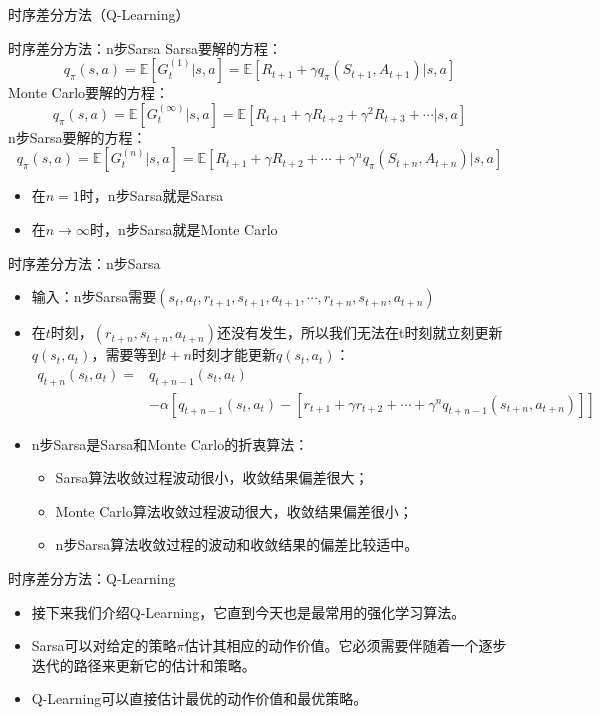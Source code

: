 \begin{section}{时序差分方法\alert{（Q-Learning）}}
\begin{frame}{时序差分方法：n步Sarsa}
    Sarsa要解的方程：
    \[
        q_\pi(s,a)=\mathbb{E}[G_t^{(1)}|s, a]=\mathbb{E}[R_{t+1}+\gamma q_\pi(S_{t+1}, A_{t+1})|s, a]
    \]
    Monte Carlo要解的方程：
    \[
        q_\pi(s,a)=\mathbb{E}[G_t^{(\infty)}|s, a]=\mathbb{E}[R_{t+1}+\gamma R_{t+2}+\gamma^2 R_{t+3}+\cdots|s, a]
    \]
    \alert{n步Sarsa要解的方程：}
    \[
        q_\pi(s,a)=\mathbb{E}[G_t^{(n)}|s, a]=\mathbb{E}[R_{t+1}+\gamma R_{t+2}+\cdots+\gamma^n q_\pi(S_{t+n}, A_{t+n})|s, a]
    \]
    \begin{itemize}
        \item 在$n=1$时，n步Sarsa就是Sarsa
        \item 在$n\rightarrow\infty$时，n步Sarsa就是Monte Carlo
    \end{itemize}
\end{frame}

\begin{frame}{时序差分方法：n步Sarsa}
    \begin{itemize}
        \item 输入：n步Sarsa需要$(s_t,a_t,r_{t+1},s_{t+1},a_{t+1},\cdots,r_{t+n},s_{t+n},a_{t+n})$
        \item 在$t$时刻，$(r_{t+n},s_{t+n},a_{t+n})$还没有发生，所以我们无法在t时刻就立刻更新$q(s_t, a_t)$，需要等到$t+n$时刻才能更新$q(s_t,a_t)$：
        \[
            \begin{aligned}
                q_{t+n}(s_t,a_t)=&q_{t+n-1}(s_t, a_t)\\
                &-\alpha[q_{t+n-1}(s_t,a_t)-[r_{t+1}+\gamma r_{t+2}+\cdots+\gamma^nq_{t+n-1}(s_{t+n}, a_{t+n})]]
            \end{aligned}
        \]
        \item n步Sarsa是Sarsa和Monte Carlo的折衷算法：
        \begin{itemize}
            \item Sarsa算法收敛过程波动很小，收敛结果偏差很大；
            \item Monte Carlo算法收敛过程波动很大，收敛结果偏差很小；
            \item n步Sarsa算法收敛过程的波动和收敛结果的偏差比较适中。
        \end{itemize}
    \end{itemize}
\end{frame}

\begin{frame}{时序差分方法：\alert{Q-Learning}}
    \begin{itemize}
        \item 接下来我们介绍\alert{Q-Learning}，它直到今天也是最常用的强化学习算法。
        \item Sarsa可以对给定的策略$\pi$估计其相应的动作价值。它必须需要伴随着一个逐步迭代的路径来更新它的估计和策略。
        \item \alert{Q-Learning}可以直接估计最优的动作价值和最优策略。
    \end{itemize}
\end{frame}


\end{section}
